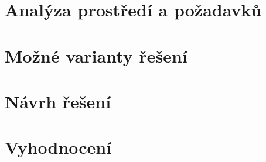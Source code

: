\documentclass[thesis=M,czech]{FITthesis}[2012/06/26]
\begin{document}
\chapter{Analýza prostředí a požadavků}\label{k2}
 
 
\chapter{Možné varianty řešení}\label{k3}
  
 

\chapter{Návrh řešení}\label{k4}
  

\chapter{Vyhodnocení}\label{k5}
   

\begin{conclusion}
	
\end{conclusion}



%


\appendix

\end{document}
